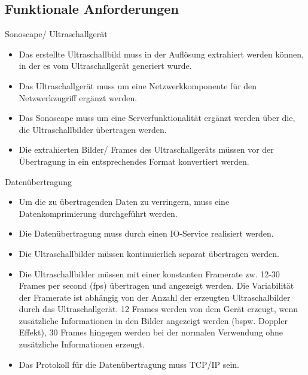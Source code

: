 \subsection{Funktionale Anforderungen}
\begin{minipage}{\textwidth}
Sonoscape/ Ultraschallgerät
\begin{itemize}
\item Das erstellte Ultraschallbild muss in der Auflösung extrahiert werden können, in der es vom Ultraschallgerät generiert wurde.
\item Das Ultraschallgerät muss um eine Netzwerkkomponente für den Netzwerkzugriff ergänzt werden.
\item Das Sonoscape muss um eine Serverfunktionalität ergänzt werden über die, die Ultraschallbilder übertragen werden.
\item Die extrahierten Bilder/ Frames des Ultraschallgeräts müssen vor der Übertragung in ein entsprechendes Format konvertiert werden.
\end{itemize}
\end{minipage}

\begin{minipage}{\textwidth}
Datenübertragung
\begin{itemize}
\item Um die zu übertragenden Daten zu verringern, muss eine Datenkomprimierung durchgeführt werden. 
\item Die Datenübertragung muss durch einen IO-Service realisiert werden.
\item Die Ultraschallbilder müssen kontinuierlich separat übertragen werden.
\item Die Ultraschallbilder müssen mit einer konstanten Framerate zw. 12-30 Frames per second (fps) übertragen und angezeigt werden. Die Variabilität der Framerate ist abhängig von der Anzahl der erzeugten Ultraschalbilder durch das Ultraschallgerät. 12 Frames werden von dem Gerät erzeugt, wenn zusätzliche Informationen in den Bilder angezeigt werden (bspw. Doppler Effekt), 30 Frames hingegen werden bei der normalen Verwendung ohne zusätzliche Informationen erzeugt.
\item Das Protokoll für die Datenübertragung muss TCP/IP sein.
\end{itemize}
\end{minipage}

